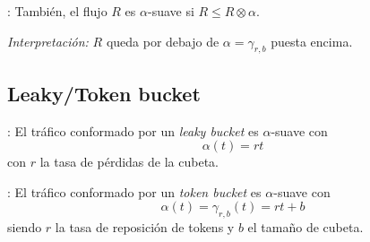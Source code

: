 \documentclass[xcolor={x11names}]{beamer}
\begin{document}
\begin{frame}{\secname: \subsecname}
    También, el flujo $R$ es
    $\alpha$-suave si
    $R\leq R\otimes \alpha$.

    \vfill

    \emph{Interpretación:}
    $R$ queda por debajo de $\alpha=
    \gamma_{r,b}$
    puesta encima.
    \begin{figure}[h]
        \centering
        
    \end{figure}
\end{frame}



\subsection{Leaky/Token bucket}
\begin{frame}{\secname: \subsecname}
    El tráfico conformado por un
    \emph{leaky bucket} es
    $\alpha$-suave con
    \begin{equation*}
        \alpha(t)=rt
    \end{equation*}
    con $r$ la tasa de pérdidas de la cubeta.

    \vfill
    
    \begin{figure}[h]
        
    \end{figure}
\end{frame}



\begin{frame}{\secname: \subsecname}
    El tráfico conformado por un
    \emph{token bucket} es
    $\alpha$-suave con
    \begin{equation*}
        \alpha(t)=\gamma_{r,b}(t)=rt+b
    \end{equation*}
    siendo $r$ la tasa de reposición de tokens
    y $b$ el tamaño de cubeta.

    \vfill
    
    \begin{figure}[h]
        
    \end{figure}
\end{frame}
\end{document}
